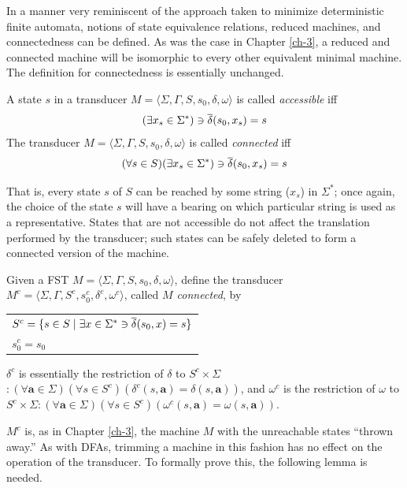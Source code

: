 In a manner very reminiscent of the approach taken to minimize deterministic
finite automata, notions of state equivalence relations, reduced machines, and
connectedness can be defined. As was the case in Chapter \ref{ch-3}, a reduced and
connected machine will be isomorphic to every other equivalent minimal machine.
The definition for connectedness is essentially unchanged.

\begin{dfn}\label{dfn-7.10}
A state $s$ in a transducer $M=\langle\Sigma,\Gamma,S,s_0,\delta,\omega\rangle$
is called \emph{accessible} iff
\[ (\exists x_s \in \Sigma^*) \ni \overline{\delta}(s_0,x_s) = s \]
The transducer $M=\langle\Sigma,\Gamma,S,s_0,\delta,\omega\rangle$ is called
\emph{connected} iff
\[ (\forall s \in S)(\exists x_s \in \Sigma^*) \ni \overline{\delta}(s_0,x_s) = s \]
\end{dfn}

That is, every state $s$ of $S$ can be reached by some string ($x_s$) in
$\Sigma^*$; once again, the choice of the state $s$ will have a bearing on which
particular string is used as a representative. States that are not accessible do
not affect the translation performed by the transducer; such states can be
safely deleted to form a connected version of the machine.

\begin{dfn}\label{dfn-7.11}
Given a FST $M=\langle\Sigma,\Gamma,S,s_0,\delta,\omega\rangle$, define the
transducer $M^c=\langle\Sigma,\Gamma,S^c,s^c_0,\delta^c,\omega^c\rangle$, called
\emph{$M$ connected}, by
\begin{center}\begin{tabular}{l}
$S^c=\{s \in S \mid \exists x \in \Sigma^* \ni \overline{\delta}(s_0,x) = s\}$ \\
$s^c_0 = s_0$
\end{tabular}\end{center}
$\delta^c$ is essentially the restriction of $\delta$ to $S^c \times \Sigma$$:
(\forall\pmb{a}\in\Sigma)(\forall s \in S^c)(\delta^c(s,\pmb{a})=\delta(s,\pmb{a}))$,
and $\omega^c$ is the restriction of $\omega$ to $S^c \times \Sigma$$:
(\forall\pmb{a}\in\Sigma)(\forall s \in S^c)(\omega^c(s,\pmb{a}) =
\omega(s,\pmb{a}))$.
\end{dfn}

$M^c$ is, as in Chapter \ref{ch-3}, the machine $M$ with the unreachable states ``thrown
away.'' As with DFAs, trimming a machine in this fashion has no effect on the
operation of the transducer. To formally prove this, the following lemma is
needed.

